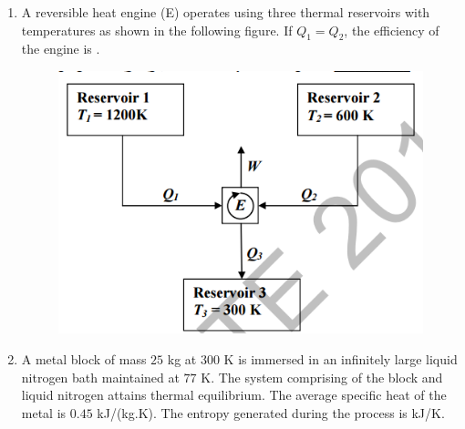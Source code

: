 \documentclass[a4paper,10pt]{article}
\begin{document}
\begin{enumerate}
    \item A reversible heat engine (E) operates using three thermal reservoirs with temperatures as shown in the following figure. If $Q_1 = Q_2$, the efficiency of the engine is \underline{\hspace{2cm}}.
    \begin{figure}[H] \centering \includegraphics[width=0.6\columnwidth]{q12_thermo.png} \caption*{} \label{fig:q12_thermo} \end{figure}
    
    \hfill{}
    \begin{enumerate}
    \end{enumerate}
    
    \item A metal block of mass $25$ kg at $300$ K is immersed in an infinitely large liquid nitrogen bath maintained at $77$ K. The system comprising of the block and liquid nitrogen attains thermal equilibrium. The average specific heat of the metal is $0.45$ kJ/(kg.K). The entropy generated during the process is \underline{\hspace{2cm}} kJ/K.
    
    \hfill{}
    \begin{enumerate}
    \end{enumerate}


\end{enumerate}
\end{document}
